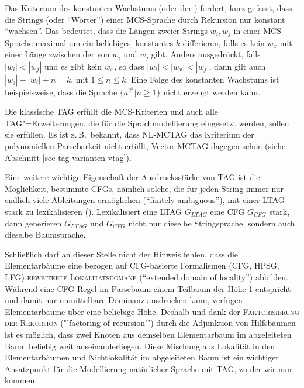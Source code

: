 Das Kriterium des konstanten Wachstums (oder der ) fordert, kurz gefasst, dass die Strings (oder "`Wörter"') einer MCS-Sprache durch Rekursion nur konstant "`wachsen"'. Das bedeutet, dass die Längen zweier Strings $w_i, w_j$ in einer MCS-Sprache maximal um ein beliebiges, konstantes $k$ differieren, falls es kein $w_x$ mit einer Länge zwischen der von $w_i$ und $w_j$  gibt. Anders ausgedrückt, falls $|w_i| < |w_j|$ und es gibt kein $w_x$, so dass $|w_i| < |w_x| < |w_j|$, dann gilt auch $|w_j| - |w_i| + n = k$, mit $1 \leq n \leq k$. Eine Folge des konstanten Wachstums ist beispielsweise, dass die Sprache $\{a^{2^n} | n \geq 1\}$ nicht erzeugt werden kann.

Die klassische TAG erfüllt die MCS-Kriterien und auch alle TAG"=Erweiterungen, die für die Sprachmodellierung eingesetzt werden, sollen sie erfüllen. Es ist z.\,B.\ bekannt, dass NL-MCTAG das Kriterium der polynomiellen Parsebarkeit nicht erfüllt, Vector-MCTAG dagegen schon (siehe Abschnitt \ref{sec-tag-varianten-vtag}).    

Eine weitere wichtige Eigenschaft der Ausdrucksstärke von TAG ist die Möglichkeit, bestimmte CFGs, nämlich solche, die für jeden String immer nur endlich viele Ableitungen ermöglichen ("`finitely ambiguous"'), mit einer LTAG stark zu lexikalisieren (\citealt{Schabes:etal:88, Joshi:Schabes:91}). Lexikalisiert eine LTAG $G_{\mathit{LTAG}}$ eine CFG $G_{\mathit{CFG}}$ stark, dann generieren $G_{\mathit{LTAG}}$ und $G_{\mathit{CFG}}$ nicht nur dieselbe Stringsprache, sondern auch dieselbe Baumsprache.

Schlie\ss lich darf an dieser Stelle nicht der Hinweis fehlen, dass die Elementarbäume eine bezogen auf CFG-basierte Formalismen (CFG, HPSG, LFG) \textsc{erweiterte Lokalitätsdomäne} ("`extended domain of locality"') abbilden. Während eine CFG-Regel im Parsebaum einem Teilbaum der Höhe 1 entspricht und damit nur unmittelbare Dominanz ausdrücken kann, verfügen Elementarbäume über eine beliebige Höhe. Deshalb und dank der \textsc{Faktorisierung der Rekursion} ("'factoring of recursion"') durch die Adjunktion von Hilfsbäumen ist es möglich, dass zwei Knoten aus demselben Elementarbaum im abgeleiteten Baum beliebig weit auseinanderliegen. Diese Mischung aus Lokalität in den Elementarbäumen und Nichtlokalität im abgeleiteten Baum ist ein wichtiger Ansatzpunkt für die Modellierung natürlicher Sprache mit TAG, zu der wir nun kommen. 


